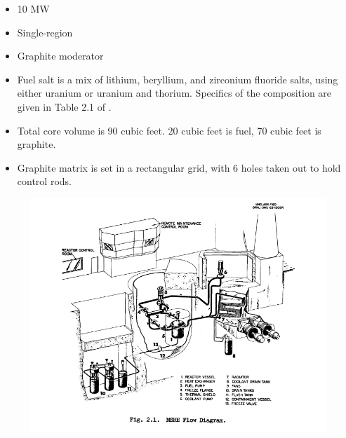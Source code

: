 \documentclass[letterpaper]{article}
\begin{document}
\begin{itemize}
\item 10 MW
\item Single-region
\item Graphite moderator
\item Fuel salt is a mix of lithium, beryllium, and zirconium fluoride salts, using either uranium or uranium and thorium.  Specifics of the composition are given in Table 2.1 of \cite{robertson_msre_1965}.
\item Total core volume is 90 cubic feet.  20 cubic feet is fuel, 70 cubic feet is graphite.
\item Graphite matrix is set in a rectangular grid, with 6 holes taken out to hold control rods.
\end{itemize}

\begin{figure}[H]
  \centering
  \includegraphics[width=1.0\linewidth]{figures/MSREsource1.png}
  \label{fig:fig1}
\end{figure}
\end{document}
